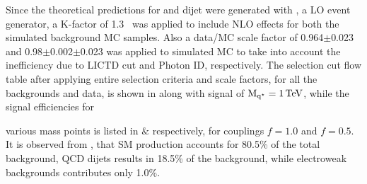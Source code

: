 Since the theoretical predictions for \gamjet and dijet were generated with \pythia, a LO event generator, a K-factor of 
1.3~\cite{kfactor,dijetkfactor1,dijetkfactor2} was applied to include \gls{NLO} effects for both the simulated background MC samples. Also a 
data/MC scale factor of 0.964$\pm$0.023 and 0.98$\pm$0.002$\pm$0.023 was applied to simulated MC to take into account the inefficiency due to 
LICTD cut and Photon ID, respectively. The selection cut flow table after applying entire selection criteria and scale factors, for all the 
backgrounds and data, is shown in \tab{\ref{Table:SelEff}} along with \qstar signal of $\mathrm{M_{q^\star}}=1\mathrm{\,TeV}$, while the signal efficiencies for 

various \qstar mass points is listed in \tab{\ref{Table:SigEff}} $\&$ \tab{\ref{Table:HalfSigEff}} respectively, for couplings $f=1.0$ and $f=0.5$. 
It is observed from \tab{\ref{Table:SelEff}}, that \gamjet SM production accounts for 80.5\% 
of the total background, QCD dijets results in 18.5\% of the background, while electroweak backgrounds contributes only 1.0\%.



